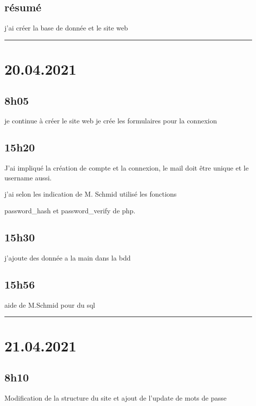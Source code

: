 \documentclass[a4paper,12pt,french]{sphinxmanual}
\begin{document}
\subsection{résumé}
\label{\detokenize{logbook:resume}}
\sphinxAtStartPar
j’ai créer la base de donnée et le site web


\bigskip\hrule\bigskip



\section{20.04.2021}
\label{\detokenize{logbook:id6}}

\subsection{8h05}
\label{\detokenize{logbook:id7}}
\sphinxAtStartPar
je continue à créer le site web je crée les formulaires pour la connexion


\subsection{15h20}
\label{\detokenize{logbook:id8}}
\sphinxAtStartPar
J’ai impliqué la création de compte et la connexion, le mail doit être unique et le username aussi.

\sphinxAtStartPar
j’ai selon les indication de M. Schmid utilisé les fonctions

\sphinxAtStartPar
password\_hash et password\_verify de php.


\subsection{15h30}
\label{\detokenize{logbook:id9}}
\sphinxAtStartPar
j’ajoute des donnée a la main dans la bdd


\subsection{15h56}
\label{\detokenize{logbook:h56}}
\sphinxAtStartPar
aide de M.Schmid pour du sql


\bigskip\hrule\bigskip



\section{21.04.2021}
\label{\detokenize{logbook:id10}}

\subsection{8h10}
\label{\detokenize{logbook:h10}}
\sphinxAtStartPar
Modification de la structure du site et ajout de l’update de mots de passe
\end{document}
